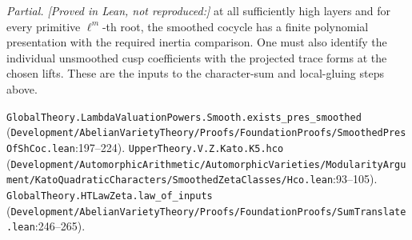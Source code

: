 \emph{Partial. [Proved in Lean, not reproduced:]} at all sufficiently high layers and for every primitive $\ell^m$-th root, the smoothed cocycle has a finite polynomial presentation with the required inertia comparison. One must also identify the individual unsmoothed cusp coefficients with the projected trace forms at the chosen lifts. These are the inputs to the character-sum and local-gluing steps above.
\par{\footnotesize \nolinkurl{GlobalTheory.LambdaValuationPowers.Smooth.exists_pres_smoothed} (\nolinkurl{Development/AbelianVarietyTheory/Proofs/FoundationProofs/SmoothedPresOfShCoc.lean}\allowbreak:197--224). \nolinkurl{UpperTheory.V.Z.Kato.K5.hco} (\nolinkurl{Development/AutomorphicArithmetic/AutomorphicVarieties/ModularityArgument/KatoQuadraticCharacters/SmoothedZetaClasses/Hco.lean}\allowbreak:93--105). \nolinkurl{GlobalTheory.HTLawZeta.law_of_inputs} (\nolinkurl{Development/AbelianVarietyTheory/Proofs/FoundationProofs/SumTranslate.lean}\allowbreak:246--265).\par}

